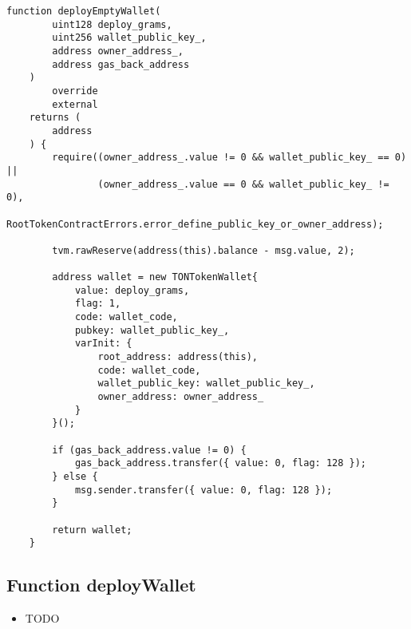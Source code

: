 \begin{lstlisting}[firstnumber=238]
    function deployEmptyWallet(
        uint128 deploy_grams,
        uint256 wallet_public_key_,
        address owner_address_,
        address gas_back_address
    )
        override
        external
    returns (
        address
    ) {
        require((owner_address_.value != 0 && wallet_public_key_ == 0) ||
                (owner_address_.value == 0 && wallet_public_key_ != 0),
                RootTokenContractErrors.error_define_public_key_or_owner_address);

        tvm.rawReserve(address(this).balance - msg.value, 2);

        address wallet = new TONTokenWallet{
            value: deploy_grams,
            flag: 1,
            code: wallet_code,
            pubkey: wallet_public_key_,
            varInit: {
                root_address: address(this),
                code: wallet_code,
                wallet_public_key: wallet_public_key_,
                owner_address: owner_address_
            }
        }();

        if (gas_back_address.value != 0) {
            gas_back_address.transfer({ value: 0, flag: 128 });
        } else {
            msg.sender.transfer({ value: 0, flag: 128 });
        }

        return wallet;
    }
\end{lstlisting}

\subsection{Function deployWallet}

\noindent\begin{itemize}
\item TODO
\end{itemize}

